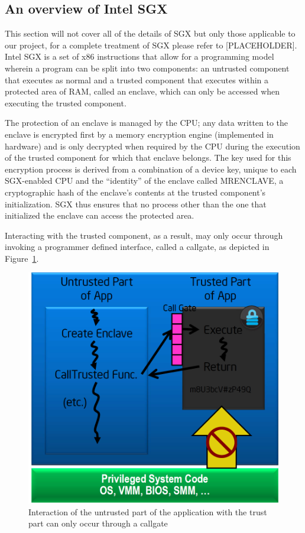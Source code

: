 \documentclass[../main.tex]{subfiles}
\begin{document}
\subsection{An overview of Intel SGX} %
This section will not cover all of the details of SGX but only those applicable to our project, for a complete treatment
of SGX please refer to [PLACEHOLDER]. Intel SGX is a set of x86 instructions that allow for a programming model wherein a
program can be split into two components: an untrusted component that executes as normal and a trusted component that executes
within a protected area of RAM, called an enclave, which can only be accessed when executing the trusted component. 

The protection of an enclave is managed by the CPU; any data written to the enclave is encrypted first by a memory encryption engine (implemented in hardware) 
and is only decrypted when required by the CPU during the execution of the trusted component for which that enclave belongs. The key used for this encryption process
is derived from a combination of a device key, unique to each SGX-enabled CPU and the ``identity'' of the enclave called MRENCLAVE, a cryptographic hash of the enclave's contents
at the trusted component's initialization. SGX thus ensures that no process other than the one that initialized the enclave can access the protected area. 

Interacting with the trusted component, as a result, may only occur through invoking a programmer defined interface, called a callgate, as depicted in Figure~\ref{fig:sgxhighlevel}.

\begin{figure}[H]
	\centering
	\includegraphics[scale=0.25]{images/sgxhighlevel.png}
	\caption{Interaction of the untrusted part of the application with the trust part can only occur through a callgate}
	\label{fig:sgxhighlevel}
\end{figure}
\end{document}
